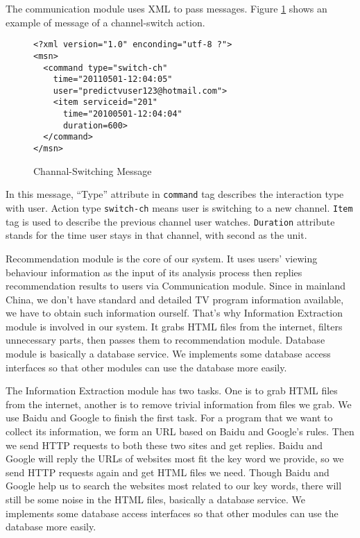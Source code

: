 The communication module uses XML to pass messages.
Figure \ref{fig:xml} shows an
example of message of a channel-switch action.

\begin{figure}[h]
\begin{center}
\small
\begin{Verbatim}[frame=single]
<?xml version="1.0" enconding="utf-8 ?">
<msn>
  <command type="switch-ch"
    time="20110501-12:04:05"
    user="predictvuser123@hotmail.com">
    <item serviceid="201"
      time="20100501-12:04:04"
      duration=600>
  </command>
</msn>
\end{Verbatim}
\caption{\label{fig:xml}Channal-Switching Message}
\end{center}
\end{figure}

In this message, ``Type'' attribute in {\tt command} tag describes
the interaction type with user. Action type {\tt switch-ch} means user is
switching to a new channel. {\tt Item} tag is used to describe the
previous channel user watches. {\tt Duration} attribute stands for the
time user stays in that channel, with second as the unit.

Recommendation module is the core of our system. It uses users' viewing
behaviour information as the
input of its analysis process then replies recommendation results to users
via Communication module. Since in mainland China, we don't have standard
and detailed TV program information available, we have to obtain such
information ourself. That's why Information Extraction module is involved
in our system. It grabs HTML files from the internet, filters unnecessary
parts, then passes them to recommendation module. Database module is
basically a database service. We implements some database access
interfaces so that other modules can use the database more easily.

The Information Extraction module has two tasks. One is to grab HTML files
from the internet, another is to remove trivial information from files we
grab. We use Baidu and Google to finish the first task. For a program
that we want to collect its information, we form an URL based on Baidu
and Google's rules. Then we send HTTP requests to both these two sites
and get replies. Baidu and Google will reply the URLs of websites most fit
the key word we provide, so we send HTTP requests again and get HTML files
we need. Though Baidu and Google help us to search the websites most
related to our key words, there will still be some noise in the HTML files,
basically a database service. We implements some database access
interfaces so that other modules can use the database more easily.
